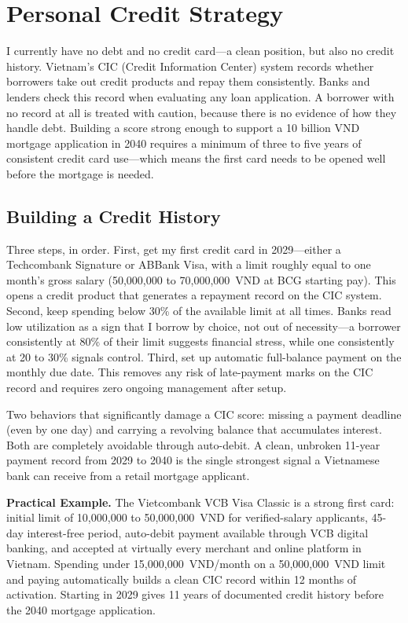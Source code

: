 \chapter{Personal Credit Strategy}

I currently have no debt and no credit card---a clean position, but also no credit history. Vietnam's CIC (Credit Information Center) system records whether borrowers take out credit products and repay them consistently. Banks and lenders check this record when evaluating any loan application. A borrower with no record at all is treated with caution, because there is no evidence of how they handle debt. Building a score strong enough to support a 10 billion VND mortgage application in 2040 requires a minimum of three to five years of consistent credit card use---which means the first card needs to be opened well before the mortgage is needed.

\section{Building a Credit History}

Three steps, in order. First, get my first credit card in 2029---either a Techcombank Signature or ABBank Visa, with a limit roughly equal to one month's gross salary (50,000,000 to 70,000,000~VND at BCG starting pay). This opens a credit product that generates a repayment record on the CIC system. Second, keep spending below 30\% of the available limit at all times. Banks read low utilization as a sign that I borrow by choice, not out of necessity---a borrower consistently at 80\% of their limit suggests financial stress, while one consistently at 20 to 30\% signals control. Third, set up automatic full-balance payment on the monthly due date. This removes any risk of late-payment marks on the CIC record and requires zero ongoing management after setup.

Two behaviors that significantly damage a CIC score: missing a payment deadline (even by one day) and carrying a revolving balance that accumulates interest. Both are completely avoidable through auto-debit. A clean, unbroken 11-year payment record from 2029 to 2040 is the single strongest signal a Vietnamese bank can receive from a retail mortgage applicant.

\textbf{Practical Example.} The Vietcombank VCB Visa Classic is a strong first card: initial limit of 10,000,000 to 50,000,000~VND for verified-salary applicants, 45-day interest-free period, auto-debit payment available through VCB digital banking, and accepted at virtually every merchant and online platform in Vietnam. Spending under 15,000,000~VND/month on a 50,000,000~VND limit and paying automatically builds a clean CIC record within 12 months of activation. Starting in 2029 gives 11 years of documented credit history before the 2040 mortgage application.

